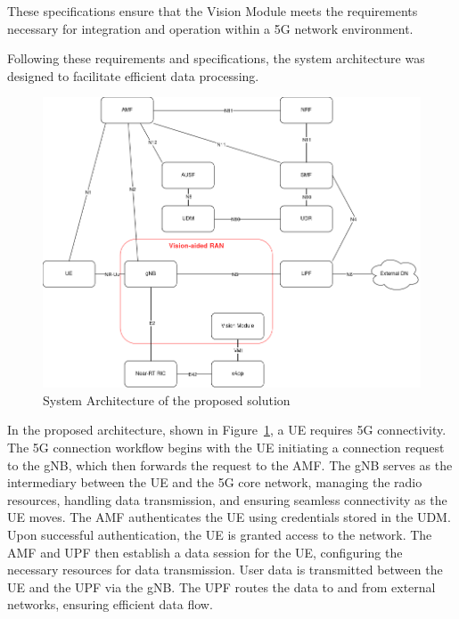 \begin{table}[H]
\caption{System Specifications.}
\label{tab:spec}
\centering
{}
\end{table}

These specifications ensure that the Vision Module meets the requirements necessary for integration and operation within a 5G network environment.


Following these requirements and specifications, the system architecture was designed to facilitate efficient data processing.

\begin{figure}[H]
    \centering
    \includegraphics[width=0.7\linewidth]{figures/Syst_Arch.drawio}
    \caption[System Architecture of the proposed solution]{System Architecture of the proposed solution}
    \label{fig:my_arch}
\end{figure}

In the proposed architecture, shown in Figure~\ref{fig:my_arch}, a UE requires 5G connectivity.
The 5G connection workflow begins with the UE initiating a connection request to the gNB, which then forwards the request to the AMF\@.
The gNB serves as the intermediary between the UE and the 5G core network, managing the radio resources, handling data transmission, and ensuring seamless connectivity as the UE moves.
The AMF authenticates the UE using credentials stored in the UDM. Upon successful authentication, the UE is granted access to the network.
The AMF and UPF then establish a data session for the UE, configuring the necessary resources for data transmission.
User data is transmitted between the UE and the UPF via the gNB\@.
The UPF routes the data to and from external networks, ensuring efficient data flow.

